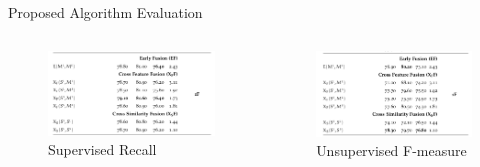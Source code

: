 \documentclass[10pt,=table]{beamer}
\begin{document}
\begin{frame}{Proposed Algorithm Evaluation}
\begin{columns}
	\begin{minipage}[c][0.5\textheight][c]{\linewidth}
	\begin{figure}
		\centering
		\includegraphics[width=1\linewidth]{image2/Chapitre4/wsd_PA_SR}
		\caption{Supervised Recall}
	\end{figure}

	\end{minipage}
	\begin{minipage}[c][0.5\textheight][c]{\linewidth}
	\begin{figure}
		\centering
		\includegraphics[width=1\linewidth]{image2/Chapitre4/wsd_PA_UF.png}
		\caption{Unsupervised F-measure}
	\end{figure}
	\end{minipage}
	\end{columns}
\end{frame}
\end{document}
